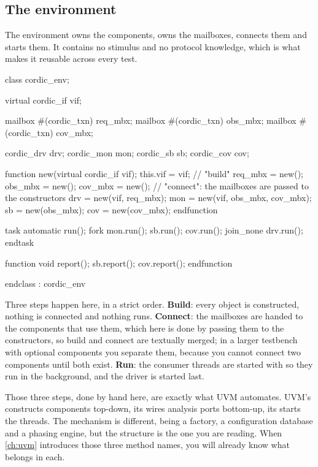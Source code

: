 \subsection{The environment}

The environment owns the components, owns the mailboxes,
connects them and starts them. It contains no stimulus and no protocol
knowledge, which is what makes it reusable across every test.

\begin{svcode}[caption={The environment: build, connect, run},label={lst:tb:env}]
class cordic_env;

  virtual cordic_if vif;

  mailbox #(cordic_txn) req_mbx;
  mailbox #(cordic_txn) obs_mbx;
  mailbox #(cordic_txn) cov_mbx;

  cordic_drv drv;
  cordic_mon mon;
  cordic_sb  sb;
  cordic_cov cov;

  function new(virtual cordic_if vif);
    this.vif = vif;
    // "build"
    req_mbx = new();
    obs_mbx = new();
    cov_mbx = new();
    // "connect": the mailboxes are passed to the constructors
    drv     = new(vif, req_mbx);
    mon     = new(vif, obs_mbx, cov_mbx);
    sb      = new(obs_mbx);
    cov     = new(cov_mbx);
  endfunction

  task automatic run();
    fork
      mon.run();
      sb.run();
      cov.run();
    join_none
    drv.run();
  endtask

  function void report();
    sb.report();
    cov.report();
  endfunction

endclass : cordic_env
\end{svcode}

Three steps happen here, in a strict order. \textbf{Build}: every object is
constructed, nothing is connected and nothing runs. \textbf{Connect}: the
mailboxes are handed to the components that use them, which here is done by
passing them to the constructors, so build and connect are textually merged; in
a larger testbench with optional components you separate them, because you
cannot connect two components until both exist. \textbf{Run}: the consumer
threads are started with  so they run in the background, and
the driver is started last.

Those three steps, done by hand here, are exactly what UVM automates. UVM's
 constructs components top-down, its 
wires analysis ports bottom-up, its  starts the threads. The
mechanism is different, being a factory, a configuration database and a phasing
engine, but the structure is the one you are reading. When \cref{ch:uvm} introduces
those three method names, you will already know what belongs in each.

